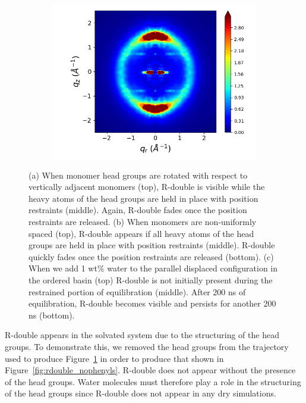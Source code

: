 \documentclass[journal=jpcbfk,manuscript=article]{achemso}
\begin{document}
\begin{figure}[!htb]
  \begin{subfigure}{0.3\linewidth}
  	\centering
  	\includegraphics[width=\textwidth]{solvated_offset_rzplot_1.png}
  	\caption{}\label{fig:solvated_pore_rzplot_norestraints}
  \end{subfigure}
  \caption{(a) When monomer head groups are rotated with respect to vertically
	  adjacent monomers (top), R-double is visible while the heavy atoms of the head
	  groups are held in place with position restraints (middle). Again, R-double
	  fades once the position restraints are released. (b) When monomers are
	  non-uniformly spaced (top), R-double appears if all heavy atoms of the head
	  groups are held in place with position restraints (middle). R-double quickly
	  fades once the position restraints are released (bottom). (c) When we add 1
	  wt\% water to the parallel displaced configuration in the ordered basin (top)
	  R-double is not initially present during the restrained portion of
	  equilibration (middle).  After 200 ns of equilibration, R-double becomes
	  visible and persists for another 200 ns (bottom).}\label{fig:rdouble}
  \end{figure}

  R-double appears in the solvated system due to the structuring of the head
  groups. To demonstrate this, we removed the head groups from the trajectory
  used to produce Figure~\ref{fig:solvated_pore_rzplot_norestraints} in order to
  produce that shown in Figure~\ref{fig:rdouble_nophenyls}. R-double does not
  appear without the presence of the head groups. Water molecules must therefore play a
  role in the structuring of the head groups since R-double does not appear in
  any dry simulations.
\end{document}
